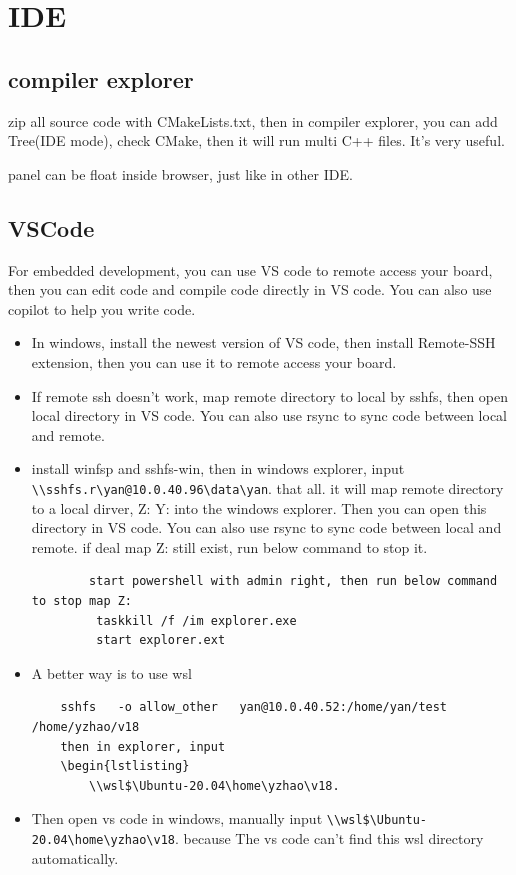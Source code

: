 \documentclass[paper=8.5in:11in, twoside, 12pt, pagesize=pdftex]{book}
\begin{document}
\section{IDE}
\subsection{compiler explorer}
zip all source code with CMakeLists.txt, then in compiler explorer, you can add Tree(IDE mode), check CMake, then it will run multi C++ files. It's very useful. 

\par panel can be float inside browser, just like in other IDE. 

\par 
\subsection{VSCode}
For embedded development, you can use VS code to remote access your board, then you can edit code and compile code directly in VS code. You can also use copilot to help you write code. 
\begin{itemize}
	\item In windows, install the newest version of VS code, then install Remote-SSH extension, then you can use it to remote access your board. 
	
	\item If remote ssh doesn't work, map remote directory to local by sshfs, then open local directory in VS code. You can also use rsync to sync code between local and remote.
	
	\item install winfsp and sshfs-win, then in windows explorer, input \verb|\\sshfs.r\yan@10.0.40.96\data\yan|. that all. it will map remote directory to a local dirver, Z: Y: into the windows explorer. Then you can open this directory in VS code. You can also use rsync to sync code between local and remote. if deal map Z: still exist, run below command to stop it. 
	
	\begin{lstlisting}
		start powershell with admin right, then run below command to stop map Z:
		 taskkill /f /im explorer.exe
		 start explorer.ext 
	\end{lstlisting}
	
	\item A better way is to use wsl 
	\begin{lstlisting}
	sshfs   -o allow_other   yan@10.0.40.52:/home/yan/test   /home/yzhao/v18
	then in explorer, input 
	\begin{lstlisting}
		\\wsl$\Ubuntu-20.04\home\yzhao\v18.
	\end{lstlisting}
	

	\item Then open vs code in windows, manually input \verb|\\wsl$\Ubuntu-20.04\home\yzhao\v18|. because The vs code can't find this wsl directory automatically. 

\end{itemize}
\end{document}
